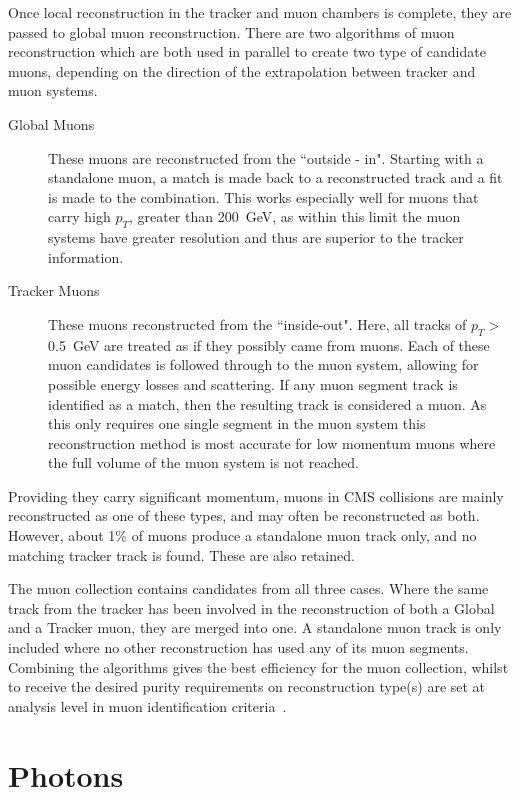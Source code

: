 Once local reconstruction in the tracker and muon chambers is complete, they are passed to global muon reconstruction. There are two algorithms of muon reconstruction which are both used in parallel to create two type of candidate muons, depending on the direction of the extrapolation between tracker and muon systems. 

\begin{description}
\item[Global Muons]{These muons are reconstructed from the ``outside - in". Starting with a standalone muon, a match is made back to a reconstructed track and a fit is made to the combination. This works especially well for muons that carry high $p_{T}$, greater than 200~GeV, as within this limit the muon systems have greater resolution and thus are superior to the tracker information.}
\item[Tracker Muons]{These muons reconstructed from the ``inside-out". Here, all tracks of $p_{T} >$ 0.5~GeV are treated as if they possibly came from muons. Each of these muon candidates is followed through to the muon system, allowing for possible energy losses and scattering.  If any muon segment track is identified as a match, then the resulting track is considered a muon. As this only requires one single segment in the muon system this reconstruction method is most accurate for low momentum muons where the full volume of the muon system is not reached.}

\end{description}

Providing they carry significant momentum, muons in CMS collisions are mainly reconstructed as one of these types, and may often be reconstructed as both. However, about 1\% of muons produce a standalone muon track only, and no matching tracker track is found. These are also retained. 

The muon collection contains candidates from all three cases. Where the same track from the tracker has been involved in the reconstruction of both a Global and a Tracker muon, they are merged into one.  A standalone muon track is only included where no other reconstruction has used any of its muon segments. Combining the algorithms gives the best efficiency for the muon collection, whilst to receive the desired purity requirements on reconstruction type(s) are set at analysis level in muon identification criteria~\cite{MUO-10-004}. 

\section{Photons}

